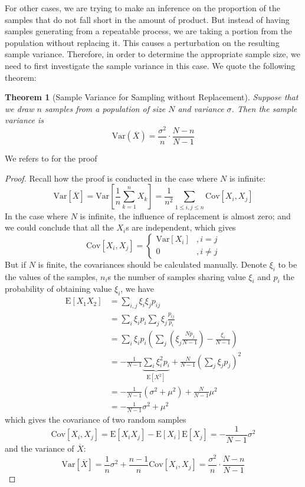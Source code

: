 \documentclass[12pt]{article}
\newtheorem{theorem}{Theorem}[section]
\def\Cov{\mathrm{Cov}}
\def\E{\mathrm{E}}
\def\Var{\mathrm{Var}}
\begin{document}
For other cases, we are trying to make an inference on the proportion of the samples that do not fall short in the amount of product. But instead of having samples generating from a repeatable process, we are taking a portion from the population without replacing it. This causes a perturbation on the resulting sample variance. Therefore, in order to determine the appropriate sample size, we need to first investigate the sample variance in this case. We quote the following theorem:

\begin{theorem}[Sample Variance for Sampling without Replacement]
    Suppose that we draw $n$ samples from a population of size $N$ and variance $\sigma$. Then the sample variance is
    $$
    \Var(\overline{X}) = \dfrac{\sigma^2}{n}\cdot\dfrac{N-n}{N-1}
    $$
\end{theorem}

We refers to \cite{Sampling} for the proof

\begin{proof}
    Recall how the proof is conducted in the case where $N$ is infinite:
    $$
    \Var[\overline{X}] = \Var\left[\frac{1}{n}\sum\limits_{k=1}^n X_k\right] = \dfrac{1}{n^2} \sum_{1\leq i,j\leq n}\Cov[X_i, X_j]
    $$
    In the case where $N$ is infinite, the influence of replacement is almost zero; and we could conclude that all the $X_i$s are independent, which gives 
    $$
    \Cov[X_i, X_j] = \begin{cases}
        \Var[X_i] &, i = j\\
        0 &, i\neq j 
    \end{cases}
    $$
    But if $N$ is finite, the covariances should be calculated manually. Denote $\xi_i$ to be the values of the samples, $n_i$s the number of samples sharing value $\xi_i$ and $p_i$ the probability of obtaining value $\xi_i$, we have
    \begin{align*}
        \E[X_1 X_2] & = \sum\limits_{i, j}\xi_i \xi_j p_{ij} \\
                    & = \sum\limits_{i}\xi_i p_i \sum\limits_{j} \xi_j \frac{p_{ij}}{p_i} \\
                    & = \sum\limits_{i}\xi_i p_i \left(\sum\limits_{j}\left(\xi_j\frac{N p_j}{N-1}\right) - \frac{\xi_i}{N-1} \right) \\ 
                    & = -\frac{1}{N-1}\underset{\E[X^2]}{\underbrace{\sum\limits_{i}\xi_i^2 p_i}} + \frac{N}{N-1}\left(\sum\limits_{j}\xi_j p_j\right)^2 \\
                    & = -\frac{1}{N-1}\left(\sigma^2 + \mu^2\right) + \frac{N}{N-1}\mu^2 \\
                    & = -\frac{1}{N-1}\sigma^2 + \mu^2
    \end{align*}
    which gives the covariance of two random samples
    $$
    \Cov[X_i, X_j] = \E[X_i X_j] - \E[X_i]\E[X_j] = -\frac{1}{N-1}\sigma^2
    $$
    and the variance of $\overline{X}$:
    $$
    \Var[\overline{X}] = \frac{1}{n}\sigma^2 + \frac{n-1}{n}\Cov[X_i, X_j] = \dfrac{\sigma^2}{n}\cdot\dfrac{N-n}{N-1}
    $$
\end{proof}
\end{document}
